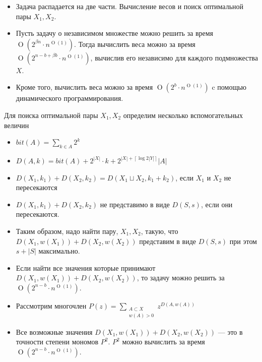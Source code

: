 \documentclass{beamer}
\theoremstyle{definition}
\newcommand{\otime}[1]{\operatorname{O}(#1)}
\newcommand{\opoly}[1]{\otime{#1\cdot n^{\otime{1}}}}
\begin{document}
\begin{frame}
\begin{itemize}
\item Задача распадается на две части. Вычисление весов и поиск оптимальной пары $X_1, X_2$.
\item Пусть задачу о независимом множестве можно решить за время $\opoly{2^{\beta n}}$.
Тогда вычислить веса можно за время $\opoly{2^{n - b + \beta b}}$, вычислив его независимо для каждого
подмножества $X$.
\item Кроме того, вычислить веса можно за время ${\opoly{2^b}}$ c помощью динамического программирования.
\end{itemize}
\end{frame}

\newcommand{\down}[1]{\left\lceil#1\right\rceil}
\newcommand{\ylog}{\down{\log{2|Y|}}}

\begin{frame}
Для поиска оптимальной пары $X_1, X_2$ определим несколько вспомогательных величин
\begin{itemize}
\item<1-> $bit(A) = \sum\limits_{k \in A}{2^k}$
\item<1-> $D(A, k) = bit(A) + 2^{|X|}\cdot k + 2^{|X| + \ylog} |A|$
\item<2-> $D(X_1, k_1) + D(X_2, k_2) = D(X_1 \sqcup X_2, k_1 + k_2)$, если $X_1$
и $X_2$ не пересекаются
\item<2-> $D(X_1, k_1) + D(X_2, k_2)$ не представимо в виде 
$D(S, s)$, если они пересекаются.
\item<2-> Таким образом, надо найти пару, $X_1, X_2$, такую, что
$D(X_1, w(X_1)) + D(X_2, w(X_2))$ представим в виде $D(S,s)$
при этом $s + |S|$ максимально.
\end{itemize}
\end{frame}

\begin{frame}
\begin{itemize}
\item Если найти все значения которые принимают $D(X_1, w(X_1)) + D(X_2, w(X_2))$,
    то задачу можно решить за $\opoly{2^{n-b}}$.
\item Рассмотрим многочлен $P(z) = \sum\limits_{\substack{A \subset X \\ w(A) > 0}}{z^{D(A, w(A))}}$
\item Все возможные значения $D(X_1, w(X_1)) + D(X_2, w(X_2))$ --- это в точности
степени мономов $P^2$. $P^2$ можно вычислить за время $\opoly{2^{n-b}}$.
\end{itemize}
\end{frame}
\end{document}
